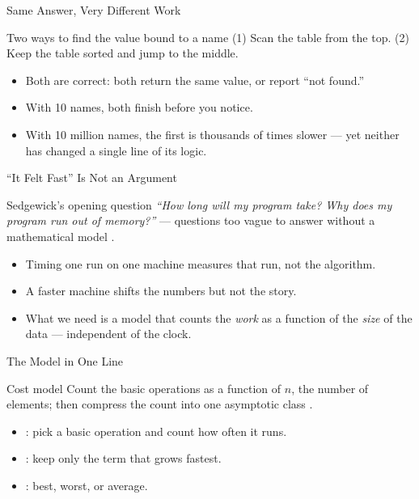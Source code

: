 \documentclass[aspectratio=169]{beamer}
\begin{document}
\begin{frame}{Same Answer, Very Different Work}
  \begin{block}{Two ways to find the value bound to a name}
    (1) Scan the table from the top. (2) Keep the table sorted and jump to the middle.
  \end{block}
  \begin{itemize}
    \item Both are correct: both return the same value, or report ``not found.''
    \item With 10 names, both finish before you notice.
    \item With 10 million names, the first is thousands of times slower ---
      yet neither has changed a single line of its logic.
  \end{itemize}
\end{frame}

\begin{frame}{``It Felt Fast'' Is Not an Argument}
  \begin{block}{Sedgewick's opening question}
    \emph{``How long will my program take? Why does my program run out of
    memory?''} --- questions too vague to answer without a mathematical model
    \cite{Sedgewick2011_algorithms}.
  \end{block}
  \begin{itemize}
    \item Timing one run on one machine measures that run, not the algorithm.
    \item A faster machine shifts the numbers but not the story.
    \item What we need is a model that counts the \emph{work} as a function of
      the \emph{size} of the data --- independent of the clock.
  \end{itemize}
\end{frame}

\begin{frame}{The Model in One Line}
  \begin{block}{Cost model}
    Count the basic operations as a function of $n$, the number of elements;
    then compress the count into one asymptotic class
    \cite{HorowitzSahni2008_fundamentals_data_structures,Neapolitan2010_foundations_of_algorithms}.
  \end{block}
  \begin{itemize}
    \item {}: pick a basic operation and count how often it runs.
    \item {}: keep only the term that grows fastest.
    \item {}: best, worst, or average.
  \end{itemize}
\end{frame}
\end{document}
